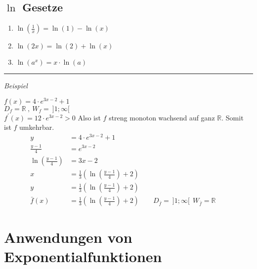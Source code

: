 \subsection{$\ln$ Gesetze}
\begin{enumerate}
    \item $\ln{(\frac{1}{x})} = \ln{(1)} - \ln{(x)}$
    \item $\ln{(2x)} = \ln{(2)} + \ln{(x)}$
    \item $\ln{(a^x)} = x \cdot \ln{(a)}$
\end{enumerate}
\noindent\rule{\textwidth}{1pt}
\textit{Beispiel}

$f(x) = 4 \cdot e^{3x-2} + 1$ \\
$D_f = \mathbb{R} \ , \ W_f = \ ] 1 ; \infty [$ \\
$f^\prime(x) = 12 \cdot e^{3x-2} > 0$ Also ist $f$ streng monoton wachsend auf ganz $\mathbb{R}$. Somit ist $f$ umkehrbar.
\begin{align*}
    y & = 4 \cdot e^{3x-2} + 1 && \\
    \frac{y - 1}{4} & = e^{3x-2} && \\
    \ln{\left(\frac{y - 1}{4}\right)} & = 3x-2 && \\
    x & = \frac{1}{3}\left(\ln{\left(\frac{y - 1}{4}\right)} + 2\right) && \\
    y & = \frac{1}{3}\left(\ln{\left(\frac{y - 1}{4}\right)} + 2\right) && \\
    \bar{f}(x) & = \frac{1}{3}\left(\ln{\left(\frac{y - 1}{4}\right)} + 2\right) \qquad D_{\bar{f}} = \ ] 1 ; \infty [ \ \ W_{\bar{f}} = \mathbb{R} &&
\end{align*}

\section{Anwendungen von Exponentialfunktionen}
